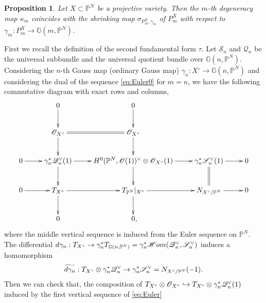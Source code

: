 \documentclass[a4paper,12pt]{amsart}
\theoremstyle{plain}
\newtheorem{prop}[prop]{Proposition}
\theoremstyle{definition}
\begin{document}
\begin{prop}\label{prop:m-th_kap-defby-shr}
  Let $X \subset {{\mathbb{P}}^N}$ be a projective variety.
  Then the $m$-th \emph{degeneracy map} $ \kappa_m $ coincides with the shrinking map $\sigma_{P_m^{X},\gamma_m}$ of $P_m^X$ with respect to $\gamma_m: P_m^X \rightarrow {{\mathbb{G}}(m,{{\mathbb{P}}^N})}$.
\end{prop}

First we recall
the definition of the second fundamental form $\tau$.
Let ${\mathscr{S}}_{n}$ and ${\mathscr{Q}}_{n}$ be
the universal subbundle and the universal quotient bundle over ${{\mathbb{G}}(n,{{\mathbb{P}}^N})}$.
Considering the $n$-th Gauss map (ordinary Gauss map)
$\gamma_n: {X{^\circ}} \rightarrow {{\mathbb{G}}(n,{{\mathbb{P}}^N})}$
and considering the dual of the sequence \autoref{eq:Euler0} for $m=n$,
we have the following commutative diagram with exact rows and columns,
\begin{equation}\label{eq:Euler}
\begin{aligned}
  \xymatrix{
    & 0 \ar[d] & 0 \ar[d]
    \\
    & {\mathscr{O}}_{X{^\circ}} \ar[d] \ar@{=}[r]& {\mathscr{O}}_{X{^\circ}} \ar[d]
    \\
    0 \ar[r] & 
    \gamma_n^*{\mathscr{Q}}_{n}\spcheck(1) \ar[r] \ar[d] &  H^0({{\mathbb{P}}^N}, {\mathscr{O}}(1))\spcheck \otimes {\mathscr{O}}_{X{^\circ}}(1) \ar[d] \ar[r] & \gamma_n^*{\mathscr{S}}_{n}\spcheck(1) \ar@{=}[d] \ar[r] & 0
    \\
    0 \ar[r] & T_{X{^\circ}} \ar[r] \ar[d]
    & T_{{\mathbb{P}}^N} |_{X{^\circ}} \ar[r] \ar[d]& N_{{X{^\circ}}/{\mathbb{P}}^N}  \ar[r] & 0
    \\
    & 0 & 0 \makebox[0mm]{ $,$}
  }
  \end{aligned}
\end{equation}
where the middle vertical sequence is induced from the Euler sequence on ${{\mathbb{P}}^N}$.
The differential
$d\gamma_n: T_{X{^\circ}} \rightarrow \gamma_n^*T_{{\mathbb{G}}(n,{{\mathbb{P}}^N})} = \gamma_n^*{\mathscr{H}om}({\mathscr{Q}}_{n}\spcheck, {\mathscr{S}}_{n}\spcheck)$ induces a homomorphism
\[
\widetilde{d{\gamma_n}}: T_{X{^\circ}} \otimes \gamma_n^*{\mathscr{Q}}_{n}\spcheck \rightarrow \gamma_n^*{\mathscr{S}}_{n}\spcheck = N_{{X{^\circ}}/{\mathbb{P}}^N}(-1).
\]
Then we can check that,
the composition of
$T_{X{^\circ}} \otimes {\mathscr{O}}_{X{^\circ}} \hookrightarrow T_{X{^\circ}} \otimes \gamma_n^*{\mathscr{Q}}_{n}\spcheck(1)$ induced by the first vertical sequence of \ref{eq:Euler}
\end{document}
